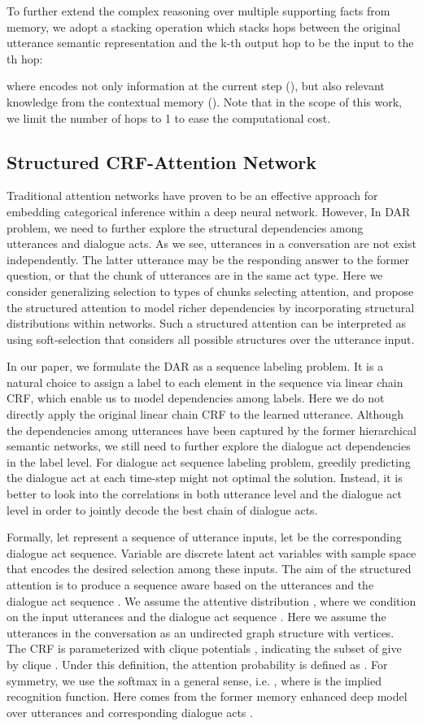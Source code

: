 \documentclass[sigconf]{acmart}
\begin{document}
To further extend the complex reasoning over multiple supporting facts from memory, we adopt a stacking operation which stacks hops between the original utterance semantic representation  and the k-th output hop  to be the input to the th hop:
 
where  encodes not only information at the current step (), but also relevant knowledge from the contextual memory (). Note that in the scope of this work, we limit the number of hops to 1 to ease the computational cost.

\subsection{Structured CRF-Attention Network}
Traditional attention networks have proven to be an effective approach for embedding categorical inference within a deep neural network. However, In DAR problem, we need to further explore the 
structural dependencies among utterances and dialogue acts. As we see, utterances in a conversation are not exist independently. The latter utterance may be the responding answer to the former question, or that the chunk of utterances are in the same act type. Here we consider generalizing selection to types of chunks selecting attention, and propose the structured attention to model richer dependencies by incorporating structural distributions within networks. Such a structured attention can be interpreted as using soft-selection that considers all possible structures over the utterance input. 

In our paper, we formulate the DAR as a sequence labeling problem. It is a natural choice to assign a label to each element in the sequence via linear chain CRF, which enable us to model dependencies among labels. Here we do not directly apply the original linear chain CRF to the learned utterance. Although the dependencies among utterances have been captured by the former hierarchical semantic networks, we still need to further explore the dialogue act dependencies in the label level. For dialogue act sequence labeling problem, greedily predicting the dialogue act at each time-step might not optimal the solution. Instead, it is better to look into the correlations in both utterance level and the dialogue act level in order to jointly decode the best chain of dialogue acts.

Formally, let  represent a sequence of utterance inputs, let  be the corresponding dialogue act sequence. Variable  are discrete latent act variables  with sample space  that encodes the desired selection among these inputs. The aim of the structured attention is to produce a sequence aware   based on the utterances  and the dialogue act sequence . We assume the attentive distribution , where we condition  on the input utterances  and the dialogue act sequence .  Here we assume the utterances in the conversation as an undirected graph structure with  vertices. The CRF is parameterized with clique potentials , indicating the subset of  give by clique . Under this definition, the attention probability is defined as . For symmetry, we use the softmax in a general sense, i.e. , where  is the implied recognition function. Here  comes from the former memory enhanced deep model over utterances  and corresponding dialogue acts . 
\end{document}
